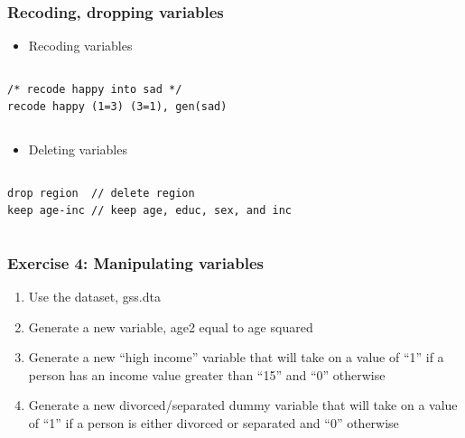 \documentclass[table]{beamer}
\begin{document}
\begin{frame}[fragile]
\frametitle{Recoding, dropping variables}
\label{sec-4-6}


\begin{itemize}
\item Recoding variables
\end{itemize}
\vspace{-.5em} \begin{columns}  \begin{block}{}

\begin{verbatim}
/* recode happy into sad */
recode happy (1=3) (3=1), gen(sad)
\end{verbatim}
\end{block} \end{columns}

\begin{itemize}
\item Deleting variables
\end{itemize}
\vspace{-.5em} \begin{columns}  \begin{block}{}

\begin{verbatim}
drop region  // delete region 
keep age-inc // keep age, educ, sex, and inc
\end{verbatim}
\end{block} \end{columns}
\end{frame}
\begin{frame}
\frametitle{Exercise 4: Manipulating variables}
\label{sec-4-7}

\begin{enumerate}
\item Use the dataset, gss.dta
\item Generate a new variable, age2 equal to age squared
\item Generate a new ``high income'' variable that will take on a value of ``1'' if a person has an income value greater than ``15'' and ``0'' otherwise
\item Generate a new divorced/separated dummy variable that will take on a value of ``1'' if a person is either divorced or separated and ``0'' otherwise
\end{enumerate}
\end{frame}
\end{document}
